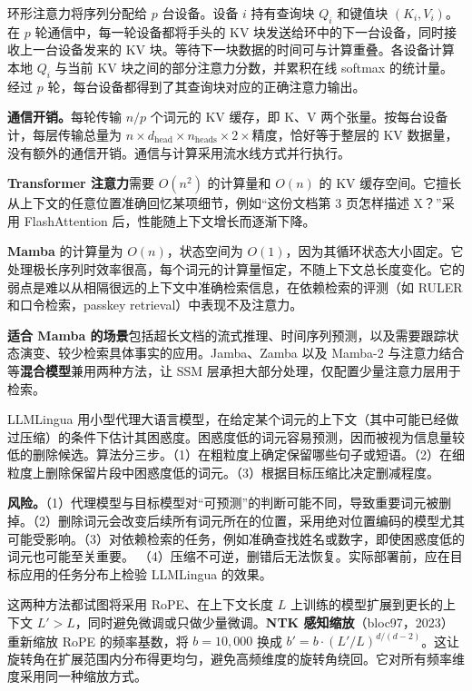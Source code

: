 \begin{interview}
环形注意力将序列分配给 \(p\) 台设备。设备 \(i\) 持有查询块 \(Q_i\) 和键值块 \((K_i,V_i)\)。在 \(p\) 轮通信中，每一轮设备都将手头的 KV 块发送给环中的下一台设备，同时接收上一台设备发来的 KV 块。等待下一块数据的时间可与计算重叠。各设备计算本地 \(Q_i\) 与当前 KV 块之间的部分注意力分数，并累积在线 softmax 的统计量。经过 \(p\) 轮，每台设备都得到了其查询块对应的正确注意力输出。

\textbf{通信开销。}每轮传输 \(n/p\) 个词元的 KV 缓存，即 K、V 两个张量。按每台设备计，每层传输总量为 \(n\times d_{\mathrm{head}}\times n_{\mathrm{heads}}\times 2\times\text{精度}\)，恰好等于整层的 KV 数据量，没有额外的通信开销。通信与计算采用流水线方式并行执行。

\textbf{Transformer 注意力}需要 \(O(n^2)\) 的计算量和 \(O(n)\) 的 KV 缓存空间。它擅长从上下文的任意位置准确回忆某项细节，例如“这份文档第 3 页怎样描述 X？”采用 FlashAttention 后，性能随上下文增长而逐渐下降。

\textbf{Mamba} 的计算量为 \(O(n)\)，状态空间为 \(O(1)\)，因为其循环状态大小固定。它处理极长序列时效率很高，每个词元的计算量恒定，不随上下文总长度变化。它的弱点是难以从相隔很远的上下文中准确检索信息，在依赖检索的评测（如 RULER 和口令检索，passkey retrieval）中表现不及注意力。

\textbf{适合 Mamba 的场景}包括超长文档的流式推理、时间序列预测，以及需要跟踪状态演变、较少检索具体事实的应用。Jamba、Zamba 以及 Mamba-2 与注意力结合等\textbf{混合模型}兼用两种方法，让 SSM 层承担大部分处理，仅配置少量注意力层用于检索。

LLMLingua 用小型代理大语言模型，在给定某个词元的上下文（其中可能已经做过压缩）的条件下估计其困惑度。困惑度低的词元容易预测，因而被视为信息量较低的删除候选。算法分三步。（1）在粗粒度上确定保留哪些句子或短语。（2）在细粒度上删除保留片段中困惑度低的词元。（3）根据目标压缩比决定删减程度。

\textbf{风险。}（1）代理模型与目标模型对“可预测”的判断可能不同，导致重要词元被删掉。（2）删除词元会改变后续所有词元所在的位置，采用绝对位置编码的模型尤其可能受影响。（3）对依赖检索的任务，例如准确查找姓名或数字，即使困惑度低的词元也可能至关重要。
（4）压缩不可逆，删错后无法恢复。实际部署前，应在目标应用的任务分布上检验 LLMLingua 的效果。

这两种方法都试图将采用 RoPE、在上下文长度 \(L\) 上训练的模型扩展到更长的上下文 \(L'>L\)，同时避免微调或只做少量微调。\textbf{NTK 感知缩放}（bloc97，2023）重新缩放 RoPE 的频率基数，将 \(b=10{,}000\) 换成 \(b'=b\cdot(L'/L)^{d/(d-2)}\)。这让旋转角在扩展范围内分布得更均匀，避免高频维度的旋转角绕回。它对所有频率维度采用同一种缩放方式。


\end{interview}
